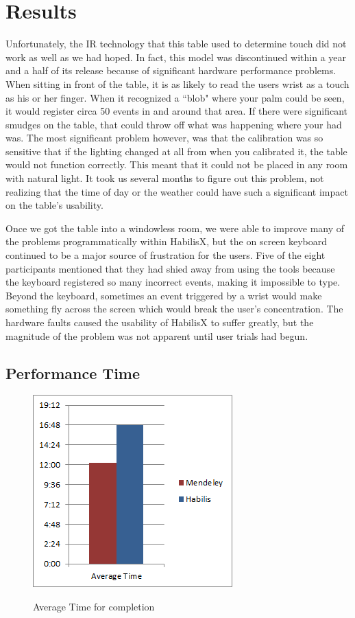 \documentclass{article}
\begin{document}
\section{Results}

Unfortunately, the IR technology that this table used to determine touch did not work as well as we had hoped.  In fact, this model was discontinued within a year and a half of its release because of significant hardware performance problems.  When sitting in front of the table, it is as likely to read the users wrist as a touch as his or her finger.  When it recognized a ``blob" where your palm could be seen, it would register circa 50 events in and around that area.  If there were significant smudges on the table, that could throw off what was happening where your had was.  The most significant problem however, was that the calibration was so sensitive that if the lighting changed at all from when you calibrated it, the table would not function correctly.  This meant that it could not be placed in any room with natural light.  It took us several months to figure out this problem, not realizing that the time of day or the weather could have such a significant impact on the table's usability.  

Once we got the table into a windowless room, we were able to improve many of the problems programmatically within HabilisX, but the on screen keyboard continued to be a major source of frustration for the users.  Five of the eight participants mentioned that they had shied away from using the tools because the keyboard registered so many incorrect events, making it impossible to type.  Beyond the keyboard, sometimes an event triggered by a wrist would make something fly across the screen which would break the user's concentration.  The hardware faults caused the usability of HabilisX to suffer greatly, but the magnitude of the problem was not apparent until user trials had begun.  
      
\subsection*{Performance Time}


\begin{figure}[b!]
\centering
\scalebox{1}
{\includegraphics{AverageTime.png}}
\caption{Average Time for completion}
\label{Fig:timeChart}
\end{figure}
\end{document}
